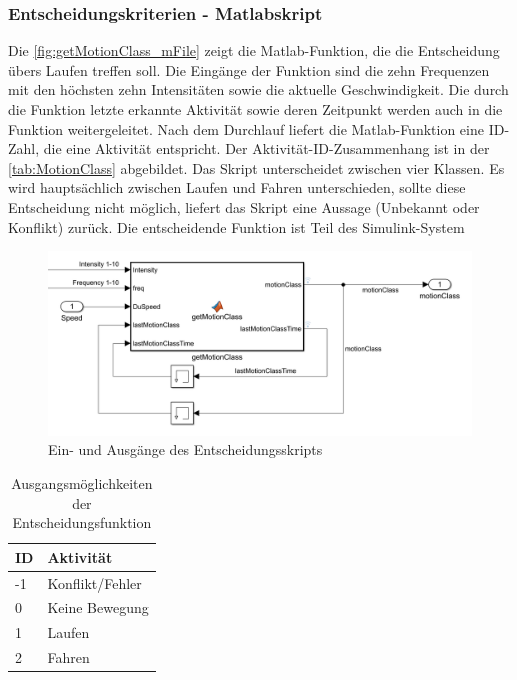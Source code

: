 \subsubsection{Entscheidungskriterien - Matlabskript}
%
%
%
%
%
Die \autoref{fig:getMotionClass_mFile} zeigt die Matlab-Funktion, die die Entscheidung übers Laufen treffen soll. Die Eingänge der Funktion sind die zehn Frequenzen mit den höchsten zehn Intensitäten sowie die aktuelle Geschwindigkeit. Die durch die Funktion letzte erkannte Aktivität sowie deren Zeitpunkt werden auch in die Funktion weitergeleitet. Nach dem Durchlauf liefert die Matlab-Funktion eine ID-Zahl, die eine Aktivität entspricht. Der Aktivität-ID-Zusammenhang ist in der \autoref{tab:MotionClass} abgebildet. Das Skript unterscheidet zwischen vier Klassen. Es wird hauptsächlich zwischen Laufen und Fahren unterschieden, sollte diese Entscheidung nicht möglich, liefert das Skript eine Aussage (Unbekannt oder Konflikt) zurück.
Die entscheidende Funktion ist Teil des Simulink-System

\begin{figure}
	\centering
	\includegraphics[width=\linewidth]{Bilder/getMotionClass_mFile.png}
	\caption{Ein- und Ausgänge des Entscheidungsskripts}
	\label{fig:getMotionClass_mFile}
\end{figure}

\begin{table}
	\caption{Ausgangsmöglichkeiten der Entscheidungsfunktion} 
	\centering
	\begin{tabular}{|l|l|}%
			\hline
			\textbf{ID} & \textbf{Aktivität} \\
			\hline
			-1 & Konflikt/Fehler \\
			\hline
			0 & Keine Bewegung \\
			\hline
			1 & Laufen \\
			\hline
			2 & Fahren \\
			\hline
		\end{tabular}
	\label{tab:MotionClass}
\end{table}


